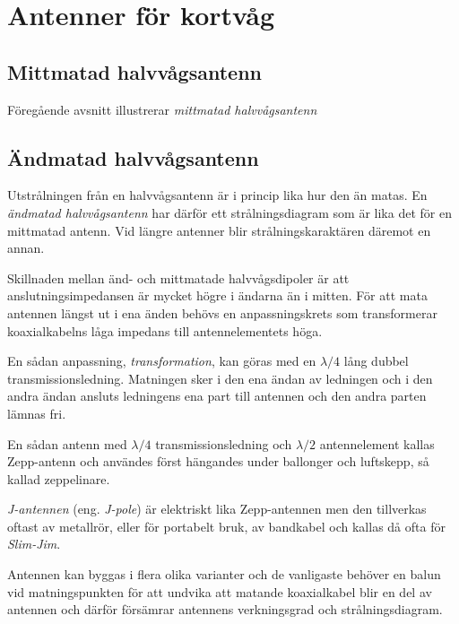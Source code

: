 \section{Antenner för kortvåg}

\subsection{Mittmatad halvvågsantenn}

Föregående avsnitt illustrerar \emph{mittmatad halvvågsantenn}

\subsection{Ändmatad halvvågsantenn}

Utstrålningen från en halvvågsantenn är i princip lika hur den än matas.
En \emph{ändmatad halvvågsantenn} har därför ett strålningsdiagram som är lika
det för en mittmatad antenn.
Vid längre antenner blir strålningskaraktären däremot en annan.

Skillnaden mellan änd- och mittmatade halvvågsdipoler är att
anslutningsimpedansen är mycket högre i ändarna än i mitten.
För att mata antennen längst ut i ena änden behövs en anpassningskrets som
transformerar koaxialkabelns låga impedans till antennelementets höga.

En sådan anpassning, \emph{transformation}, kan göras med en \(\lambda/4\) lång
dubbel transmissionsledning.
Matningen sker i den ena ändan av ledningen och i den andra ändan ansluts
ledningens ena part till antennen och den andra parten lämnas fri.

En sådan antenn med \(\lambda/4\) transmissionsledning och \(\lambda/2\)
antennelement kallas Zepp-antenn och användes först hängandes under ballonger
och luftskepp, så kallad zeppelinare.

\emph{J-antennen} (eng. \emph{J-pole}) \cite[J-antenne]{Rothammel2001} är
elektriskt lika Zepp-antennen men den tillverkas oftast av metallrör, eller
för portabelt bruk, av bandkabel och kallas då ofta för \emph{Slim-Jim}.

Antennen kan byggas i flera olika varianter och de vanligaste behöver en balun
vid matningspunkten för att undvika att matande koaxialkabel blir en del av
antennen och därför försämrar antennens verkningsgrad och strålningsdiagram.

